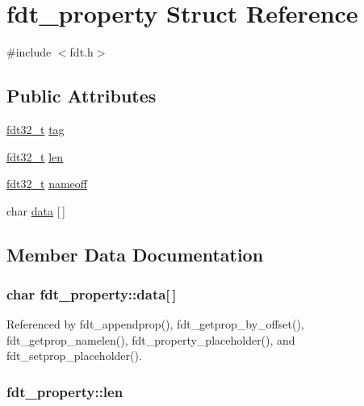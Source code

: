 \hypertarget{structfdt__property}{\section{fdt\-\_\-property Struct Reference}
\label{structfdt__property}
}


{\ttfamily \#include $<$fdt.\-h$>$}

\subsection*{Public Attributes}
\begin{DoxyCompactItemize}
\item 
\hyperlink{libfdt__env_8h_a76887ac8786252752fb3f9a39b21f3af}{fdt32\-\_\-t} \hyperlink{structfdt__property_a6c0d0fd0e741c931f7b3ca1482193740}{tag}
\item 
\hyperlink{libfdt__env_8h_a76887ac8786252752fb3f9a39b21f3af}{fdt32\-\_\-t} \hyperlink{structfdt__property_a48e6236319453578c3ca7c106b382a2f}{len}
\item 
\hyperlink{libfdt__env_8h_a76887ac8786252752fb3f9a39b21f3af}{fdt32\-\_\-t} \hyperlink{structfdt__property_ad5753794266beffe67b79b6e5b3ab352}{nameoff}
\item 
char \hyperlink{structfdt__property_abb52f21622f86ed9b268f49b76f23aef}{data} \mbox{[}$\,$\mbox{]}
\end{DoxyCompactItemize}


\subsection{Member Data Documentation}
\hypertarget{structfdt__property_abb52f21622f86ed9b268f49b76f23aef}{
\subsubsection[{data}]{\setlength{\rightskip}{0pt plus 5cm}char fdt\-\_\-property\-::data\mbox{[}$\,$\mbox{]}}}\label{structfdt__property_abb52f21622f86ed9b268f49b76f23aef}


Referenced by fdt\-\_\-appendprop(), fdt\-\_\-getprop\-\_\-by\-\_\-offset(), fdt\-\_\-getprop\-\_\-namelen(), fdt\-\_\-property\-\_\-placeholder(), and fdt\-\_\-setprop\-\_\-placeholder().

\hypertarget{structfdt__property_a48e6236319453578c3ca7c106b382a2f}{
\subsubsection[{len}]{ fdt\-\_\-property\-::len}}\label{structfdt__property_a48e6236319453578c3ca7c106b382a2f}


